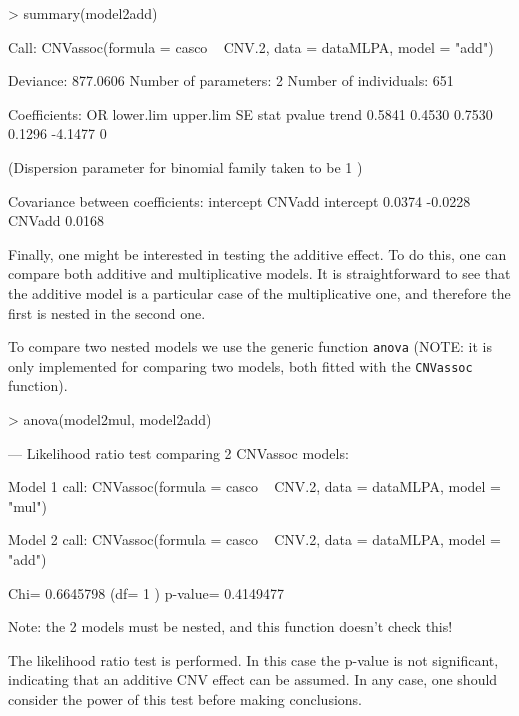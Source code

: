 \documentclass[11pt]{article}
\begin{document}

\begin{Schunk}
\begin{Sinput}
> summary(model2add)
\end{Sinput}
\begin{Soutput}
Call:
CNVassoc(formula = casco ~ CNV.2, data = dataMLPA, model = "add")

Deviance: 877.0606 
Number of parameters: 2 
Number of individuals: 651 

Coefficients:
           OR lower.lim upper.lim      SE    stat pvalue
trend  0.5841    0.4530    0.7530  0.1296 -4.1477      0

(Dispersion parameter for  binomial  family taken to be  1 )


Covariance between coefficients:
          intercept CNVadd 
intercept  0.0374   -0.0228
CNVadd               0.0168
\end{Soutput}
\end{Schunk}



Finally, one might be interested in testing the additive effect. To do this, one can compare both additive and multiplicative models. 
It is straightforward to see that the additive model is a particular case of the multiplicative one, and therefore the first is nested 
in the second one.

To compare two nested models we use the generic function {\tt anova} (NOTE: it is only implemented for comparing two models, both fitted with 
the {\tt CNVassoc} function).


\begin{Schunk}
\begin{Sinput}
> anova(model2mul, model2add)
\end{Sinput}
\begin{Soutput}
--- Likelihood ratio test comparing 2 CNVassoc models:


Model 1 call:  CNVassoc(formula = casco ~ CNV.2, data = dataMLPA, model = "mul") 

Model 2 call:  CNVassoc(formula = casco ~ CNV.2, data = dataMLPA, model = "add") 

Chi= 0.6645798 (df= 1 )  p-value= 0.4149477 

  Note: the 2 models must be nested, and this function doesn't check this!
\end{Soutput}
\end{Schunk}


The likelihood ratio test is performed. In this case the p-value is not significant, indicating that an additive CNV effect can be
assumed. In any case, one should consider the power of this test before making conclusions.
\end{document}
